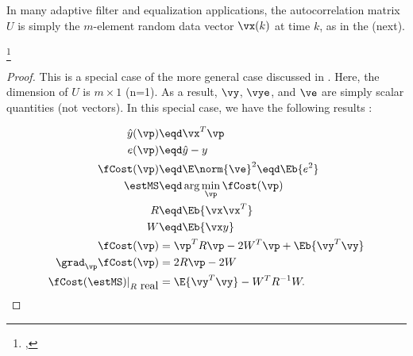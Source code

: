 In many adaptive filter and equalization applications,
the autocorrelation matrix $U$ is simply the $m$-element
random data vector $\vx(k)$ at time $k$, as in the  (next).
\begin{corollary}
\footnote{
  ,
  }
\end{corollary}
\begin{proof}
This is a special case of the more general case discussed
in .
Here, the dimension of $U$ is $m\times1$ (n=1).
As a result,
$\vy$, $\vye$, and $\ve$ are simply scalar quantities (not vectors).
In this special case, we have the following results
:

\begin{align*}
   \hat{y}(\vp)   &\eqd \vx^T \vp    \\
   e(\vp)    &\eqd \hat{y}-y \\
   \fCost(\vp) &\eqd \E\norm{\ve}^2 \eqd \Eb{e^2} \\
   \estMS      &\eqd \arg\min_\vp \fCost(\vp)  \\
   R           &\eqd \Eb{\vx\vx^T}   \\
   W           &\eqd \Eb{ \vx y }    \\
    \fCost(\vp)                     &= \vp^T R \vp -2W^T\vp  + \Eb{\vy^T\vy} \\
    \grad_\vp \fCost(\vp)           &= 2R\vp - 2W  \\
    \fCost(\estMS)|_{R\mbox{ real}} &=    \E{\vy^T\vy} - W^T R^{-1}W.
\end{align*}
\end{proof}

